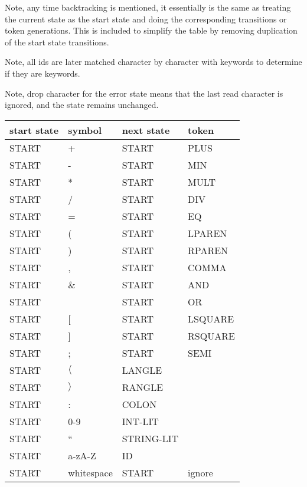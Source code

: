 \documentclass[11pt, fleqn]{article}
\begin{document}
Note, any time backtracking is mentioned, it essentially is the same as treating the current state as the start state and doing the corresponding transitions or token generations. This is included to simplify the table by removing duplication of the start state transitions.

Note, all ids are later matched character by character with keywords to determine if they are keywords.

Note, drop character for the error state means that the last read character is ignored, and the state remains unchanged.

\begin{longtable}{l|l|l|l}
start state		&	symbol						&	next	 state		&	token		 		\\
\hline
START			&	+								&	START			&	PLUS					\\
START			&	-								&	START			&	MIN					\\
START			&	*								&	START			&	MULT					\\
START			&	/								&	START			&	DIV					\\
START			&	=								&	START			&	EQ					\\
START			&	(								&	START			&	LPAREN				\\
START			&	)								&	START			&	RPAREN				\\
START			&	,								&	START			&	COMMA				\\
START			&	\&								&	START			&	AND					\\
START			&	\textbar								&	START			&	OR					\\
START			&	[								&	START			&	LSQUARE				\\
START			&	]								&	START			&	RSQUARE				\\
START			&	;								&	START			&	SEMI					\\
START			&	$\langle$						&	LANGLE			&						\\
START			&	$\rangle$						&	RANGLE			&						\\
START			&	:								&	COLON			&						\\
START			&	0-9								&	INT-LIT			&						\\
START			&	``								&	STRING-LIT		&						\\
START			&	a-zA-Z							&	ID				&						\\
START			&	whitespace						&	START			&	ignore				\\

\end{longtable}
\end{document}
